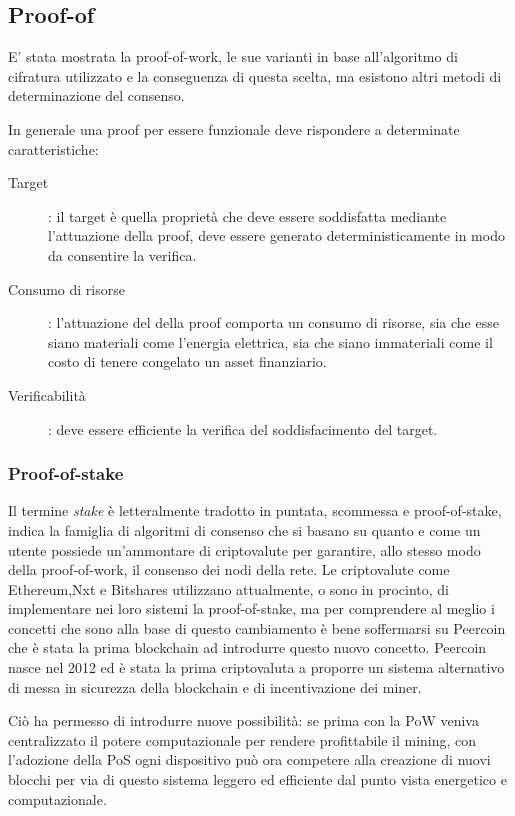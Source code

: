 	\subsection{Proof-of}
	E' stata mostrata la proof-of-work, le sue varianti in base all'algoritmo di cifratura utilizzato e la conseguenza di questa scelta, ma esistono altri metodi di determinazione del consenso.
	
	In generale una proof per essere funzionale deve rispondere a determinate caratteristiche:
		
		\begin{description}
			\item[Target]: il target è quella proprietà che deve essere soddisfatta mediante l'attuazione della proof, deve essere generato deterministicamente in modo da consentire la verifica.
			\item[Consumo di risorse]: l'attuazione del della proof comporta un consumo di risorse, sia che esse siano materiali come l'energia elettrica, sia che siano immateriali come il costo di tenere congelato un asset finanziario.
			\item[Verificabilità]: deve essere efficiente la verifica del soddisfacimento del target.
		\end{description}
	\subsubsection{Proof-of-stake}
	Il termine \textit{stake} è letteralmente tradotto in puntata, scommessa e proof-of-stake, indica la famiglia di algoritmi di consenso che si basano su quanto e come un utente possiede un'ammontare di criptovalute per garantire, allo stesso modo della proof-of-work, il consenso dei nodi della rete.
	Le criptovalute come Ethereum,Nxt e Bitshares utilizzano attualmente, o sono in procinto, di implementare nei loro sistemi la proof-of-stake, ma per comprendere al meglio i concetti che sono alla base di questo cambiamento è bene soffermarsi su Peercoin che è stata la prima blockchain ad introdurre questo nuovo concetto.%
	Peercoin nasce nel 2012 ed è stata la prima criptovaluta a proporre un sistema alternativo di messa in sicurezza della blockchain e di incentivazione dei miner.
	
	Ciò ha permesso di introdurre nuove possibilità: se prima con la PoW veniva centralizzato il potere computazionale per rendere profittabile il mining, con l'adozione della PoS ogni dispositivo può ora competere alla creazione di nuovi blocchi per via di questo sistema leggero ed efficiente dal punto vista energetico e computazionale.
	

